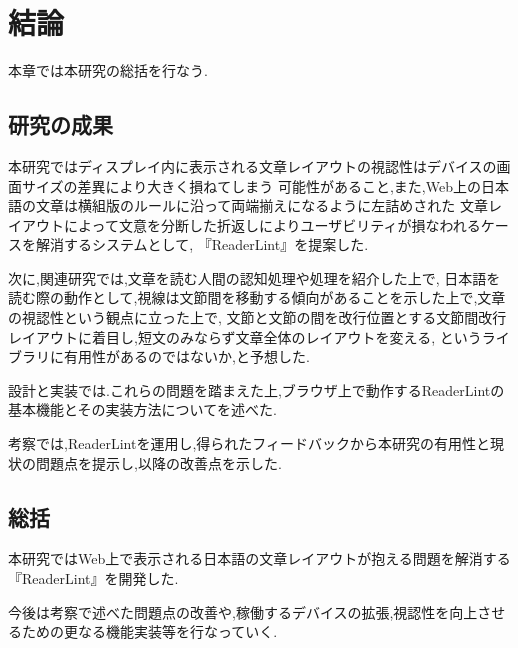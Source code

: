 \chapter{結論}

本章では本研究の総括を行なう.

\newpage

\section{研究の成果}
本研究ではディスプレイ内に表示される文章レイアウトの視認性はデバイスの画面サイズの差異により大きく損ねてしまう
可能性があること,また,Web上の日本語の文章は横組版のルールに沿って両端揃えになるように左詰めされた
文章レイアウトによって文意を分断した折返しによりユーザビリティが損なわれるケースを解消するシステムとして,
『ReaderLint』を提案した.

次に,関連研究では,文章を読む人間の認知処理や処理を紹介した上で,
日本語を読む際の動作として,視線は文節間を移動する傾向があることを示した上で,文章の視認性という観点に立った上で,
文節と文節の間を改行位置とする文節間改行レイアウトに着目し,短文のみならず文章全体のレイアウトを変える,
というライブラリに有用性があるのではないか,と予想した.

設計と実装では.これらの問題を踏まえた上,ブラウザ上で動作するReaderLintの基本機能とその実装方法についてを述べた.

考察では,ReaderLintを運用し,得られたフィードバックから本研究の有用性と現状の問題点を提示し,以降の改善点を示した.

\section{総括}
本研究ではWeb上で表示される日本語の文章レイアウトが抱える問題を解消する『ReaderLint』を開発した.

今後は考察で述べた問題点の改善や,稼働するデバイスの拡張,視認性を向上させるための更なる機能実装等を行なっていく.
